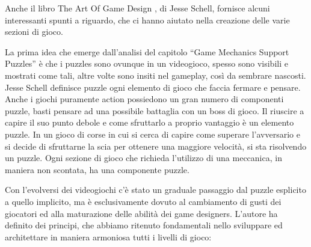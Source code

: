 Anche il libro The Art Of Game Design \cite{artOfGameDesign}, di Jesse Schell, fornisce alcuni interessanti spunti a riguardo, che ci hanno aiutato nella creazione delle varie sezioni di gioco.

La prima idea che emerge dall’analisi del capitolo “Game Mechanics Support Puzzles” è che i puzzles sono ovunque in un videogioco, spesso sono visibili e mostrati come tali, altre volte sono insiti nel gameplay, così da sembrare nascosti. Jesse Schell definisce puzzle ogni elemento di gioco che faccia fermare e pensare. Anche i giochi puramente action possiedono un gran numero di componenti puzzle, basti pensare ad una possibile battaglia con un boss di gioco. Il riuscire a capire il suo punto debole e come sfruttarlo a proprio vantaggio è un elemento puzzle. In un gioco di corse in cui si cerca di capire come superare l’avversario e si decide di sfruttarne la scia per ottenere una maggiore velocità, si sta risolvendo un puzzle. Ogni sezione di gioco che richieda l’utilizzo di una meccanica, in maniera non scontata, ha una componente puzzle.

Con l’evolversi dei videogiochi c’è stato un graduale passaggio dal puzzle esplicito a quello implicito, ma è esclusivamente dovuto al cambiamento di gusti dei giocatori ed alla maturazione delle abilità dei game designers.
L’autore ha definito dei principi, che abbiamo ritenuto fondamentali nello sviluppare ed architettare in maniera armoniosa tutti i livelli di gioco:

